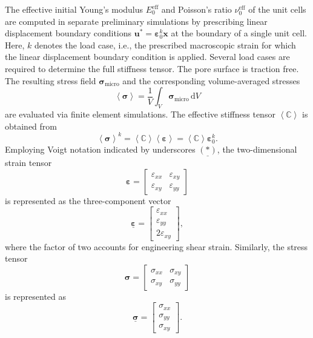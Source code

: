 \documentclass[pdflatex,sn-mathphys-num]{sn-jnl}%
\theoremstyle{thmstyleone}%
\theoremstyle{thmstyletwo}%
\theoremstyle{thmstylethree}%
\begin{document}
The effective initial Young’s modulus $E_0^{\text{eff}}$ and Poisson’s ratio $\nu_0^{\text{eff}}$ of the unit cells are computed in separate preliminary simulations by prescribing linear displacement boundary conditions $\boldsymbol{u}^* = \boldsymbol{\varepsilon}_0^k \boldsymbol{x}$ at the boundary of a single unit cell.
Here, $k$ denotes the load case, i.e., the prescribed macroscopic strain for which the linear displacement boundary condition is applied. Several load cases are required to determine the full stiffness tensor. The pore surface is traction free.
The resulting stress field $\boldsymbol{\sigma}_{\text{micro}}$ and the corresponding volume-averaged stresses
\begin{equation}
    \left< \boldsymbol{\sigma} \right> = \dfrac{1}{V} \int_V \boldsymbol{\sigma}_{\text{micro}} \, \mathrm{d}V
\end{equation}
are evaluated via finite element simulations. The effective stiffness tensor $\left< \boldsymbol{\mathbb{C}} \right>$ is obtained from
\begin{equation}
    \left< \boldsymbol{\sigma} \right>^k = \left< \boldsymbol{\mathbb{C}} \right>  \left< \boldsymbol{\varepsilon} \right> = \left< \boldsymbol{\mathbb{C}} \right>  \boldsymbol{\varepsilon}_0^k.
\end{equation}
Employing Voigt notation indicated by underscores $\underline{(*)}$, the two-dimensional strain tensor
\[
\boldsymbol{\varepsilon} = 
\begin{bmatrix} \varepsilon_{xx} & \varepsilon_{xy} \\ \varepsilon_{xy} & \varepsilon_{yy} \end{bmatrix}
\]
is represented as the three-component vector
\begin{equation}
\underline{\boldsymbol{\varepsilon}} = 
\begin{bmatrix} \varepsilon_{xx} \\ \varepsilon_{yy} \\ 2 \varepsilon_{xy} \end{bmatrix},
\end{equation}
where the factor of two accounts for engineering shear strain. Similarly, the stress tensor
\[
\boldsymbol{\sigma} = 
\begin{bmatrix} \sigma_{xx} & \sigma_{xy} \\ \sigma_{xy} & \sigma_{yy} \end{bmatrix}
\]
is represented as
\begin{equation}
\underline{\boldsymbol{\sigma}} = 
\begin{bmatrix} \sigma_{xx} \\ \sigma_{yy} \\ \sigma_{xy} \end{bmatrix}.
\end{equation}
\end{document}
